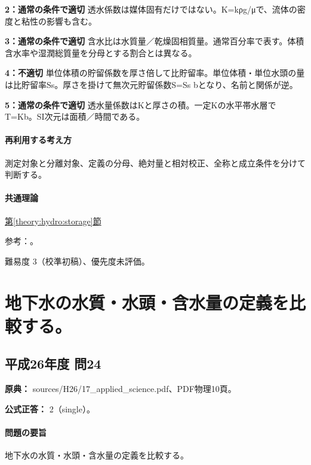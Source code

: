 \noindent\textbf{2：通常の条件で適切} 透水係数は媒体固有だけではない。K=\allowbreak{}kρg/μで、流体の密度と粘性の影響も含む。\par

\noindent\textbf{3：通常の条件で適切} 含水比は水質量／乾燥固相質量。通常百分率で表す。体積含水率や湿潤総質量を分母とする割合とは異なる。\par

\noindent\textbf{4：不適切} 単位体積の貯留係数を厚さ倍して比貯留率。単位体積・単位水頭の量は比貯留率Ss。厚さを掛けて無次元貯留係数S=\allowbreak{}Ss bとなり、名前と関係が逆。\par

\noindent\textbf{5：通常の条件で適切} 透水量係数はKと厚さの積。一定Kの水平帯水層でT=\allowbreak{}Kb。SI次元は面積／時間である。\par

\paragraph{再利用する考え方} 測定対象と分離対象、定義の分母、絶対量と相対校正、全称と成立条件を分けて判断する。

\paragraph{共通理論} \hyperref[theory:hydro:storage]{第\ref*{theory:hydro:storage}節}

\par 参考：\cite{analysis49_storage_ref,analysis49_darcy_ref,inorganic_hydro_ref}。

\par 難易度 3（校準初稿）、優先度未評価。

\section{地下水の水質・水頭・含水量の定義を比較する。}

\subsection{平成26年度 問24}
\label{q:h26-reg-applied-24}

\noindent\textbf{原典：} sources/H26/17\_applied\_science.pdf、PDF物理10頁。

\textbf{公式正答：} 2（single）。

\paragraph{問題の要旨} 地下水の水質・水頭・含水量の定義を比較する。

